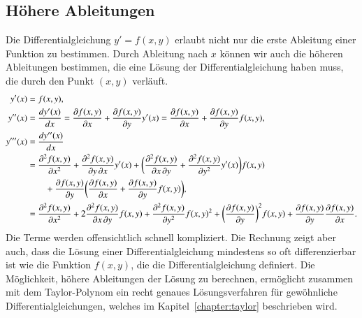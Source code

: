 \subsection{Höhere Ableitungen\label{grundlagen:hoehere-ableitungen}}
%
Die Differentialgleichung $y'=f(x,y)$ erlaubt nicht nur die erste
Ableitung einer Funktion zu bestimmen.
Durch Ableitung nach $x$ können wir auch die höheren Ableitungen
bestimmen, die eine Lösung der Differentialgleichung haben muss,
die durch den Punkt $(x,y)$ verläuft.
\begin{align}
y'(x)
&=
f(x,y),
\notag
\\
y''(x)
&=
\frac{dy'(x)}{dx}
=
\frac{\partial f(x,y)}{\partial x} + \frac{\partial f(x,y)}{\partial y}y'(x)
=
\frac{\partial f(x,y)}{\partial x} + \frac{\partial f(x,y)}{\partial y}f(x,y),
\label{grundlagen:2abl}
\\
y'''(x)
&=
\frac{dy''(x)}{dx}
\notag
\\
&=
\frac{\partial^2 f(x,y)}{\partial x^2}
+ \frac{\partial^2 f(x,y)}{\partial y\,\partial x}y'(x)
+ \biggl(\frac{\partial^2 f(x,y)}{\partial x\,\partial y}
+ \frac{\partial^2 f(x,y)}{\partial y^2}y'(x)\biggr)f(x,y)
\notag
\\
&\qquad
+ \frac{\partial f(x,y)}{\partial y}\biggl(
\frac{\partial f(x,y)}{\partial x} + \frac{\partial f(x,y)}{\partial y}f(x,y)
\biggr),
\notag
\\
&=
\frac{\partial^2 f(x,y)}{\partial x^2}
+ 2\frac{\partial^2 f(x,y)}{\partial x\,\partial y}f(x,y)
+ \frac{\partial^2 f(x,y)}{\partial y^2}f(x,y)^2
+ \biggl(\frac{\partial f(x,y)}{\partial y}\biggr)^2 f(x,y)
+ \frac{\partial f(x,y)}{\partial y} \frac{\partial f(x,y)}{\partial x}.
\label{grundlagen:3abl}
\end{align}
Die Terme werden offensichtlich schnell kompliziert.
Die Rechnung zeigt aber auch, dass die Lösung einer Differentialgleichung
mindestens so oft differenzierbar ist wie die Funktion $f(x,y)$, die 
die Differentialgleichung definiert.
Die Möglichkeit, höhere Ableitungen der Lösung zu berechnen, 
ermöglicht zusammen mit dem Taylor-Polynom ein recht genaues
%
Lösungsverfahren für gewöhnliche Differentialgleichungen,
welches im Kapitel~\ref{chapter:taylor} beschrieben wird.


